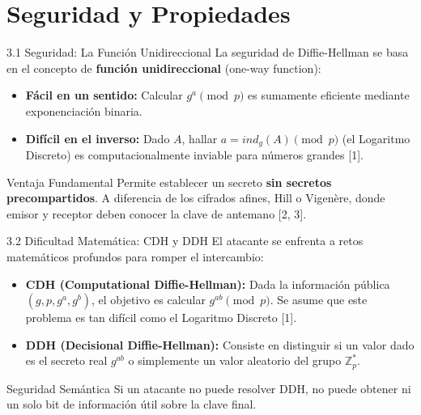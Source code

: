 \documentclass{beamer}
\begin{document}
\section{Seguridad y Propiedades}
\begin{frame}{3.1 Seguridad: La Función Unidireccional}
    La seguridad de Diffie-Hellman se basa en el concepto de \textbf{función unidireccional} (one-way function):
    \begin{itemize}
        \item \textbf{Fácil en un sentido:} Calcular $g^a \pmod p$ es sumamente eficiente mediante exponenciación binaria.
        \item \textbf{Difícil en el inverso:} Dado $A$, hallar $a = ind_g(A) \pmod p$ (el Logaritmo Discreto) es computacionalmente inviable para números grandes [1].
    \end{itemize}
    
    \begin{block}{Ventaja Fundamental}
        Permite establecer un secreto \textbf{sin secretos precompartidos}. A diferencia de los cifrados afines, Hill o Vigenère, donde emisor y receptor deben conocer la clave de antemano [2, 3].
    \end{block}
\end{frame}

\begin{frame}{3.2 Dificultad Matemática: CDH y DDH}
    El atacante se enfrenta a retos matemáticos profundos para romper el intercambio:
    \begin{itemize}
        \item \textbf{CDH (Computational Diffie-Hellman):} Dada la información pública $(g, p, g^a, g^b)$, el objetivo es calcular $g^{ab} \pmod p$. Se asume que este problema es tan difícil como el Logaritmo Discreto [1].
        \item \textbf{DDH (Decisional Diffie-Hellman):} Consiste en distinguir si un valor dado es el secreto real $g^{ab}$ o simplemente un valor aleatorio del grupo $\mathbb{Z}_p^*$.
    \end{itemize}
    \begin{exampleblock}{Seguridad Semántica}
        Si un atacante no puede resolver DDH, no puede obtener ni un solo bit de información útil sobre la clave final.
    \end{exampleblock}
\end{frame}
\end{document}
